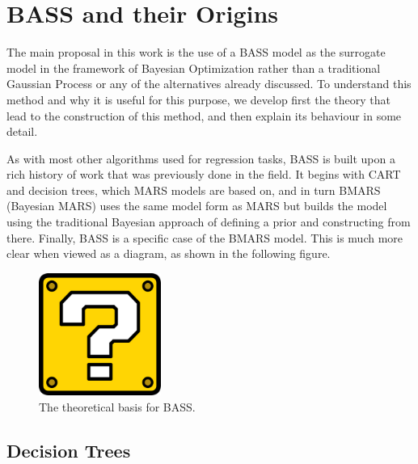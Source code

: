 \chapter{BASS and their Origins}

The main proposal in this work is the use of a BASS model as the surrogate model in the framework of Bayesian Optimization rather than a traditional Gaussian Process or any of the alternatives already discussed. To understand this method and why it is useful for this purpose, we develop first the theory that lead to the construction of this method, and then explain its behaviour in some detail. 

As with most other algorithms used for regression tasks, BASS is built upon a rich history of work that was previously done in the field. It begins with CART and decision trees, which MARS models are based on, and in turn BMARS (Bayesian MARS) uses the same model form as MARS but builds the model using the traditional Bayesian approach of defining a prior and constructing from there. Finally, BASS is a specific case of the BMARS model. This is much more clear when viewed as a diagram, as shown in the following figure. 

\begin{figure}[h]
	\includegraphics[width=4cm]{Figures/missing.png}
	\centering
	\caption{The theoretical basis for BASS.}
	\label{building_BASS}
\end{figure}

\section{Decision Trees}

